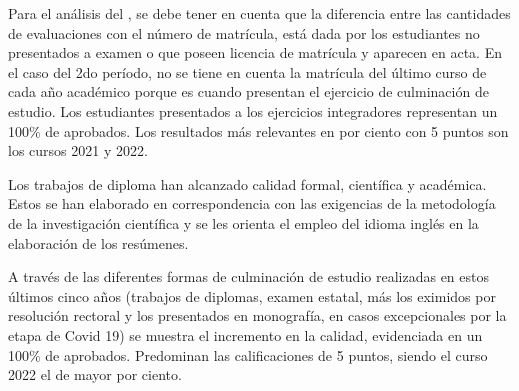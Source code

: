 Para el análisis del \hyperref[tableresultados]{\textcolor{blue}{\tablename}}, se debe tener en cuenta que la diferencia entre las cantidades de evaluaciones con el número de matrícula, está dada por los estudiantes no presentados a examen o que poseen licencia de matrícula y aparecen en acta. En el caso del 2do período, no se tiene en cuenta la matrícula del último curso de cada año académico porque es cuando presentan el ejercicio de culminación de estudio. Los estudiantes presentados a los ejercicios integradores representan un 100\% de aprobados. Los resultados más relevantes en por ciento con 5 puntos son los cursos 2021 y 2022.

Los trabajos de diploma han alcanzado calidad formal, científica y académica. Estos se han elaborado en correspondencia con las exigencias de la metodología de la investigación científica y se les orienta el empleo del idioma inglés en la elaboración de los resúmenes. 

A través de las diferentes formas de culminación de estudio realizadas en estos últimos cinco años (trabajos de diplomas, examen estatal, más los eximidos por resolución rectoral y los presentados en monografía, en casos excepcionales por la etapa de Covid 19) se muestra el incremento en la calidad, evidenciada en un 100\% de aprobados. Predominan las calificaciones de 5 puntos, siendo el curso 2022 el de mayor por ciento.




